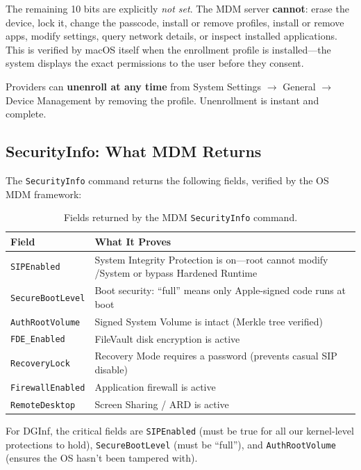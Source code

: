 \documentclass[10pt,twocolumn,letterpaper]{article}
\begin{document}
The remaining 10 bits are explicitly \emph{not set}. The MDM server \textbf{cannot}: erase the device, lock it, change the passcode, install or remove profiles, install or remove apps, modify settings, query network details, or inspect installed applications. This is verified by macOS itself when the enrollment profile is installed---the system displays the exact permissions to the user before they consent.

Providers can \textbf{unenroll at any time} from System Settings $\to$ General $\to$ Device Management by removing the profile. Unenrollment is instant and complete.

\subsection{SecurityInfo: What MDM Returns}

The \texttt{SecurityInfo} command returns the following fields, verified by the OS MDM framework:

\begin{table}[h]
\centering
\caption{Fields returned by the MDM \texttt{SecurityInfo} command.}
\vspace{4pt}
\small
\begin{tabular}{@{}lp{4.5cm}@{}}
\toprule
\textbf{Field} & \textbf{What It Proves} \\
\midrule
\texttt{SIPEnabled} & System Integrity Protection is on---root cannot modify /System or bypass Hardened Runtime \\
\texttt{SecureBootLevel} & Boot security: ``full'' means only Apple-signed code runs at boot \\
\texttt{AuthRootVolume} & Signed System Volume is intact (Merkle tree verified) \\
\texttt{FDE\_Enabled} & FileVault disk encryption is active \\
\texttt{RecoveryLock} & Recovery Mode requires a password (prevents casual SIP disable) \\
\texttt{FirewallEnabled} & Application firewall is active \\
\texttt{RemoteDesktop} & Screen Sharing / ARD is active \\
\bottomrule
\end{tabular}
\end{table}

For DGInf, the critical fields are \texttt{SIPEnabled} (must be true for all our kernel-level protections to hold), \texttt{SecureBootLevel} (must be ``full''), and \texttt{AuthRootVolume} (ensures the OS hasn't been tampered with).
\end{document}
